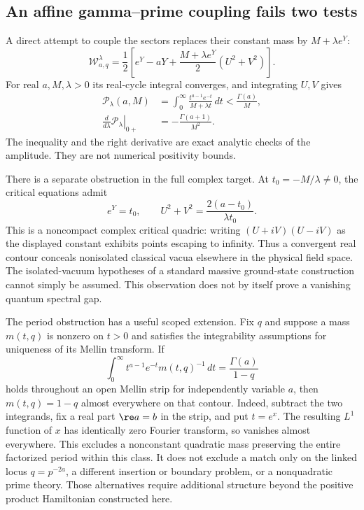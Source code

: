 \subsection{An affine gamma--prime coupling fails two tests}
\label{ext-affine}

A direct attempt to couple the sectors replaces their constant mass
by $M+\lambda e^Y$:
\begin{equation}
 \mathcal W^\lambda_{a,q}
 =\frac12\left[e^Y-aY+
             \frac{M+\lambda e^Y}{2}(U^2+V^2)\right].
 \label{ext-affine-superpotential}
\end{equation}
For real $a,M,\lambda>0$ its real-cycle integral converges, and
integrating $U,V$ gives
\begin{equation}
 \begin{split}
 \mathcal P_\lambda(a,M)
 &=\int_0^\infty\frac{t^{a-1}e^{-t}}{M+\lambda t}\,dt
 <\frac{\Gamma(a)}{M},\\
 \left.\frac{d}{d\lambda}\mathcal P_\lambda\right|_{0+}
 &=-\frac{\Gamma(a+1)}{M^2}.
 \end{split}
 \label{ext-affine-period}
\end{equation}
The inequality and the right derivative are exact analytic checks
of the amplitude.  They are not numerical positivity bounds.

There is a separate obstruction in the full complex target.  At
$t_0=-M/\lambda\ne0$, the critical equations admit
\begin{equation}
 e^Y=t_0,\qquad
 U^2+V^2=\frac{2(a-t_0)}{\lambda t_0}.
 \label{ext-critical-quadric}
\end{equation}
This is a noncompact complex critical quadric: writing
$(U+iV)(U-iV)$ as the displayed constant exhibits points escaping
to infinity.  Thus a convergent real contour conceals nonisolated
classical vacua elsewhere in the physical field space.  The
isolated-vacuum hypotheses of a standard massive ground-state
construction cannot simply be assumed.  This observation does not
by itself prove a vanishing quantum spectral gap.

The period obstruction has a useful scoped extension.  Fix $q$ and
suppose a mass $m(t,q)$ is nonzero on $t>0$ and satisfies the
integrability assumptions for uniqueness of its Mellin transform.
If
\begin{equation}
 \int_0^\infty t^{a-1}e^{-t}m(t,q)^{-1}\,dt
       =\frac{\Gamma(a)}{1-q}
 \label{ext-mellin-test}
\end{equation}
holds throughout an open Mellin strip for independently variable
$a$, then $m(t,q)=1-q$ almost everywhere on that contour.  Indeed,
subtract the two integrands, fix a real part $\re a=b$ in the strip,
and put $t=e^x$.  The resulting $L^1$ function of $x$ has identically
zero Fourier transform, so vanishes almost everywhere.  This
excludes a nonconstant quadratic mass preserving the entire
factorized period within this class.  It does not exclude a match
only on the linked locus $q=p^{-2a}$, a different insertion or
boundary problem, or a nonquadratic prime theory.  Those alternatives
require additional structure beyond the positive product
Hamiltonian constructed here.
